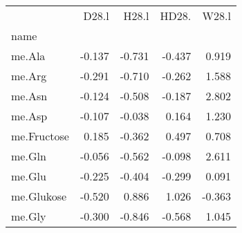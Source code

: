 \begin{tabular}{lrrrr}
 & D28.l & H28.l & HD28. & W28.l \\
name &  &  &  &  \\
me.Ala & {\cellcolor[HTML]{E6E6EC}} \color[HTML]{000000} -0.137 & {\cellcolor[HTML]{6A8DBF}} \color[HTML]{F1F1F1} -0.731 & {\cellcolor[HTML]{A8B7CF}} \color[HTML]{000000} -0.437 & {\cellcolor[HTML]{B04748}} \color[HTML]{F1F1F1} 0.919 \\
me.Arg & {\cellcolor[HTML]{C5CDDB}} \color[HTML]{000000} -0.291 & {\cellcolor[HTML]{6F91BF}} \color[HTML]{F1F1F1} -0.710 & {\cellcolor[HTML]{CBD1DE}} \color[HTML]{000000} -0.262 & {\cellcolor[HTML]{A9373B}} \color[HTML]{F1F1F1} 1.588 \\
me.Asn & {\cellcolor[HTML]{E9E9ED}} \color[HTML]{000000} -0.124 & {\cellcolor[HTML]{98ACC9}} \color[HTML]{F1F1F1} -0.508 & {\cellcolor[HTML]{DCDEE6}} \color[HTML]{000000} -0.187 & {\cellcolor[HTML]{A9373B}} \color[HTML]{F1F1F1} 2.802 \\
me.Asp & {\cellcolor[HTML]{ECEBEF}} \color[HTML]{000000} -0.107 & {\cellcolor[HTML]{F8F4F5}} \color[HTML]{000000} -0.038 & {\cellcolor[HTML]{F0DBDA}} \color[HTML]{000000} 0.164 & {\cellcolor[HTML]{A9373B}} \color[HTML]{F1F1F1} 1.230 \\
me.Fructose & {\cellcolor[HTML]{EED7D5}} \color[HTML]{000000} 0.185 & {\cellcolor[HTML]{B7C2D5}} \color[HTML]{000000} -0.362 & {\cellcolor[HTML]{D49896}} \color[HTML]{F1F1F1} 0.497 & {\cellcolor[HTML]{C3706E}} \color[HTML]{F1F1F1} 0.708 \\
me.Gln & {\cellcolor[HTML]{F5F2F4}} \color[HTML]{000000} -0.056 & {\cellcolor[HTML]{8FA5C7}} \color[HTML]{F1F1F1} -0.562 & {\cellcolor[HTML]{EEEDF0}} \color[HTML]{000000} -0.098 & {\cellcolor[HTML]{A9373B}} \color[HTML]{F1F1F1} 2.611 \\
me.Glu & {\cellcolor[HTML]{D4D8E2}} \color[HTML]{000000} -0.225 & {\cellcolor[HTML]{AFBCD1}} \color[HTML]{000000} -0.404 & {\cellcolor[HTML]{C3CBDA}} \color[HTML]{000000} -0.299 & {\cellcolor[HTML]{F7EAE8}} \color[HTML]{000000} 0.091 \\
me.Glukose & {\cellcolor[HTML]{97ABC9}} \color[HTML]{F1F1F1} -0.520 & {\cellcolor[HTML]{B34D4E}} \color[HTML]{F1F1F1} 0.886 & {\cellcolor[HTML]{A9373B}} \color[HTML]{F1F1F1} 1.026 & {\cellcolor[HTML]{B7C2D5}} \color[HTML]{000000} -0.363 \\
me.Gly & {\cellcolor[HTML]{C3CBDA}} \color[HTML]{000000} -0.300 & {\cellcolor[HTML]{507EBC}} \color[HTML]{F1F1F1} -0.846 & {\cellcolor[HTML]{8DA4C6}} \color[HTML]{F1F1F1} -0.568 & {\cellcolor[HTML]{A9373B}} \color[HTML]{F1F1F1} 1.045 \\

\end{tabular}
